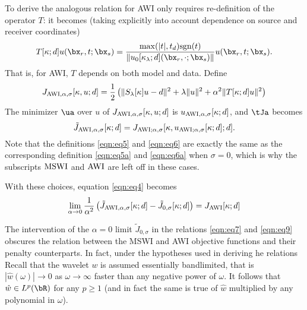 To derive the analogous relation for AWI only requires re-definition
of the operator $T$: it becomes (taking explicitly into account
dependence on source and receiver coordinates)
\begin{equation}
  \label{eqn:eq8}
  T[\kappa;d] u(\bx_r,t;\bx_s) = \frac{\max(|t|, t_d)
    \mbox{sgn}(t)}{\|u_0[\kappa_{\lambda};d](\bx_r,\cdot;\bx_s)\|}
  u(\bx_r,t;\bx_s).
\end{equation}
That is, for AWI, $T$ depends on both model and data. Define
\begin{equation}
  \label{eqn:eq5a}
   J_{{\rm AWI},\alpha,\sigma}[\kappa,u;d] = \frac{1}{2}\left(\|S_{\lambda}[\kappa]u-d\|^2 +
   \lambda\|u\|^2 + \alpha^2\|T[\kappa;d]u\|^2\right)
 \end{equation}
The minimizer $\ua$ over $u$ of $ J_{{\rm AWI}, \alpha,\sigma}[\kappa,u;d]$ is
$u_{{\rm AWI},\alpha,\sigma}[\kappa;d]$, and $\tJa$ becomes
\begin{equation}
  \label{eqn:eq6a}
  \tilde{J}_{{\rm AWI},\alpha,\sigma}[\kappa;d] =
  J_{{\rm AWI};\alpha,\sigma}[\kappa,u_{{\rm AWI};\alpha,\sigma}[\kappa;d];d].
\end{equation}
Note that the definitions \ref{eqn:eq5} and \ref{eqn:eq6} are exactly
the same as the corresponding definition \ref{eqn:eq5a} and
\ref{eqn:eq6a} when $\sigma=0$, which is why the subscripts ${\rm
  MSWI}$ and ${\rm AWI}$ are left off in these cases.

With these choices, equation \ref{eqn:eq4} becomes 
\begin{equation}
  \label{eqn:eq9}
  \lim_{\alpha \rightarrow 0}
  \frac{1}{\alpha^2}\left(\tilde{J}_{{\rm AWI},\alpha,\sigma}[\kappa;d]-\tilde{J}_{0,\sigma}[\kappa;d]\right)=
  J_{\rm AWI}[\kappa;d]
\end{equation}

The intervention of the $\alpha=0$ limit $\tilde{J}_{0,\sigma}$ in the
relations \ref{eqn:eq7} and \ref{eqn:eq9} obscures the relation
between the MSWI and AWI objective functions and their penalty
counterparts. In fact, under the hypotheses used in deriving he
relations 
Recall that the wavelet $w$ is assumed essentially bandlimited, that is
$|\hat{w}(\omega)| \rightarrow 0$ as $\omega \rightarrow \infty$
faster than any negative power of $\omega$. It follows that $\hat{w}
\in L^p(\bR)$ for any $p \ge 1$ (and in fact the same is true of
$\hat{w}$ multiplied by any polynomial in $\omega$). 

